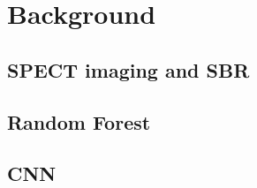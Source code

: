 \section{Background}
\label{sec:background}

\subsection{SPECT imaging and SBR}
\label{subsec:somesubsec}

\subsection{Random Forest}
\label{subsec:randfors}

\subsection{CNN}
\label{subsec:cnn}
